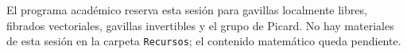 \begin{nota}
El programa académico reserva esta sesión para gavillas localmente libres, fibrados vectoriales, gavillas invertibles y el grupo de Picard. No hay materiales de esta sesión en la carpeta \texttt{Recursos}; el contenido matemático queda pendiente.
\end{nota}
